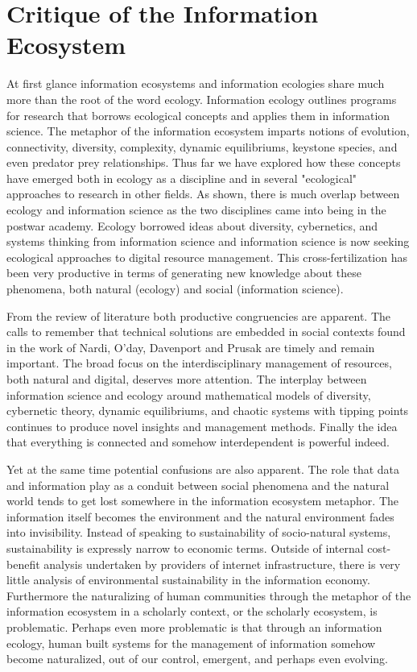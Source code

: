 \section{Critique of the Information Ecosystem}

At first glance information ecosystems and information ecologies share much more than the root of the word ecology. Information ecology outlines programs for research that borrows ecological concepts and applies them in information science.  The metaphor of the information ecosystem imparts notions of evolution, connectivity, diversity, complexity, dynamic equilibriums, keystone species, and even predator prey relationships. Thus far we have explored how these concepts have emerged both in ecology as a discipline and in several "ecological" approaches to research in other fields. As shown, there is much overlap between ecology and information science as the two disciplines came into being in the postwar academy. Ecology borrowed ideas about diversity, cybernetics, and systems thinking from information science and information science is now seeking ecological approaches to digital resource management. This cross-fertilization has been very productive in terms of generating new knowledge about these phenomena, both natural (ecology) and social (information science). 

From the review of literature both productive congruencies are apparent. The calls to remember that technical solutions are embedded in social contexts found in the work of Nardi, O'day, Davenport and Prusak are timely and remain important. The broad focus on the interdisciplinary management of resources, both natural and digital, deserves more attention. The interplay between information science and ecology around mathematical models of diversity, cybernetic theory, dynamic equilibriums, and chaotic systems with tipping points continues to produce novel insights and management methods. Finally the idea that everything is connected and somehow interdependent is powerful indeed.

Yet at the same time potential confusions are also apparent. The role that data and information play as a conduit between social phenomena and the natural world tends to get lost somewhere in the information ecosystem metaphor. The information itself becomes the environment and the natural environment fades into invisibility. Instead of speaking to sustainability of socio-natural systems, sustainability is expressly narrow to economic terms. Outside of internal cost-benefit analysis undertaken by providers of internet infrastructure, there is very little analysis of environmental sustainability in the information economy. Furthermore the naturalizing of human communities through the metaphor of the information ecosystem in a scholarly context, or the scholarly ecosystem, is problematic. Perhaps even more problematic is that through an information ecology, human built systems for the management of information somehow become naturalized, out of our control, emergent, and perhaps even evolving.


